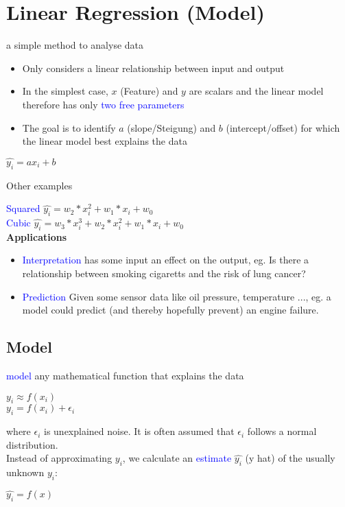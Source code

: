 \section{Linear Regression (Model)}
a simple method to analyse data \\

\begin{itemize}
    \item Only considers a linear relationship between input and output
    \item In the simplest case, $x$ (Feature) and $y$ are scalars and the linear model therefore has only \textcolor{blue}{two free parameters}
    \item The goal is to identify $a$ (slope/Steigung) and $b$ (intercept/offset) for which the linear model best explains the data
\end{itemize}
\begin{center}
    $\hat{y_i} = ax_i + b$
\end{center}

Other examples

\textcolor{blue}{Squared} $\hat{y_i} = w_2 * x_i^2 + w_1 * x_i + w_0$\\
\textcolor{blue}{Cubic} $\hat{y_i} = w_3 * x_i^3 + w_2 * x_i^2 + w_1 * x_i + w_0$\\

\textbf{Applications}
\begin{itemize}
    \item \textcolor{blue}{Interpretation} has some input an effect on the output, eg. Is there a relationship between smoking cigaretts and the risk of lung cancer?
    \item \textcolor{blue}{Prediction} Given some sensor data like oil pressure, temperature ..., eg. a model could predict (and thereby hopefully prevent) an engine failure.
\end{itemize}

\subsection{Model}
\textcolor{blue}{model} any mathematical function that explains the data\\

\begin{center}
    $y_i \approx f(x_i)$\\
    $y_i = f(x_i) + \epsilon_i$\\
\end{center}
where $\epsilon_i$ is unexplained noise. It is often assumed that $\epsilon_i$ follows a normal distribution.\\
Instead of approximating $y_i$, we calculate an \textcolor{blue}{estimate} $\hat{y_i}$ (y hat) of the usually unknown $y_i$: \\
\begin{center}
    $\hat{y_i} = f(x)$
\end{center}



